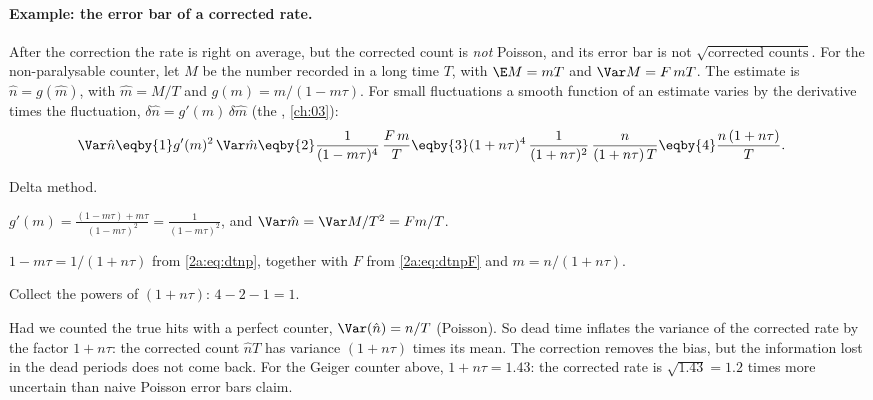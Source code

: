 \paragraph{Example: the error bar of a corrected rate.} After the correction the rate is right on average, but the corrected count is \emph{not} Poisson, and its error bar is not $\sqrt{\text{corrected counts}}$. For the non-paralysable counter, let $M$ be the number recorded in a long time $T$, with $\E M=mT$ and $\Var M=F\,mT$. The estimate is $\hat n=g(\hat m)$, with $\hat m=M/T$ and $g(m)=m/(1-m\tau)$. For small fluctuations a smooth function of an estimate varies by the derivative times the fluctuation, $\delta\hat n=g'(m)\,\delta\hat m$ (the , \cref{ch:03}):
\begin{align}
  \Var\hat n
  &\eqby{1} g'(m)^2\,\Var\hat m
  \eqby{2} \frac{1}{(1-m\tau)^4}\,\frac{F\,m}{T}
  \eqby{3} (1+n\tau)^4\,\frac{1}{(1+n\tau)^2}\,\frac{n}{(1+n\tau)\,T}
  \eqby{4} \frac{n\,(1+n\tau)}{T}. \label{2a:eq:dtcorrvar}
\end{align}
\begin{explain}
  \item Delta method.
  \item $g'(m)=\frac{(1-m\tau)+m\tau}{(1-m\tau)^2}=\frac1{(1-m\tau)^2}$, and $\Var\hat m=\Var M/T^2=Fm/T$.
  \item $1-m\tau=1/(1+n\tau)$ from \eqref{2a:eq:dtnp}, together with $F$ from \eqref{2a:eq:dtnpF} and $m=n/(1+n\tau)$.
  \item Collect the powers of $(1+n\tau)$: $4-2-1=1$.
\end{explain}
Had we counted the true hits with a perfect counter, $\Var(\hat n)=n/T$ (Poisson). So dead time inflates the variance of the corrected rate by the factor $1+n\tau$: the corrected count $\hat nT$ has variance $(1+n\tau)$ times its mean. The correction removes the bias, but the information lost in the dead periods does not come back. For the Geiger counter above, $1+n\tau=1.43$: the corrected rate is $\sqrt{1.43}=1.2$ times more uncertain than naive Poisson error bars claim.

